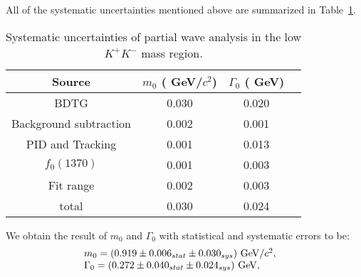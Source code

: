 \documentclass[aps,prd,twocolumn,showpacs,amsmath,amssymb]{revtex4-1}
\begin{document}
    All of the systematic uncertainties mentioned above are summarized in Table~\ref{MIPWA-Sys}.
    \begin{table}[htbp]
        \caption{Systematic uncertainties of partial wave analysis in the low $K^{+}K^{-}$ mass region.}
        \label{MIPWA-Sys}
        \begin{center}
            \begin{tabular}{cccc}
                \hline\hline
                Source   &                                                      $m_{0}$ ( GeV/$c^{2}$)  &$\Gamma_{0}$ ( GeV)\\
                \hline
                BDTG                     & 0.030                  &   0.020 \\
                Background subtraction   & 0.002                  &   0.001 \\
                PID and Tracking         & 0.001                  &   0.013 \\
                $f_{0}(1370)$            & 0.001                  &   0.003 \\
                Fit range                & 0.002                  &   0.003 \\

                \hline
                total                                   & 0.030                  &   0.024\\
                \hline\hline
            \end{tabular}
        \end{center}
    \end{table}
    We obtain the result of $m_{0}$ and $\Gamma_{0}$ with statistical and systematic errors to be:
    \begin{equation}
        \begin{array}{lr}
            m_{0} = (0.919 \pm 0.006_{stat} \pm 0.030_{sys}) \ {\rm GeV}/c^{2}, &\\
            \Gamma_{0} = (0.272 \pm 0.040_{stat} \pm 0.024_{sys})\ {\rm GeV}, &
        \end{array}\label{S-wave-sys} 
    \end{equation}













\end{document}
